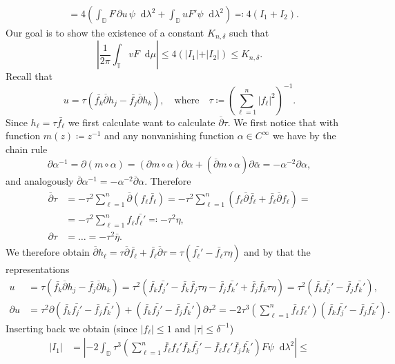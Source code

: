 \documentclass[letterpaper, 11pt]{article}
\newcommand{\D}{\mathbb{D}}
\newcommand{\T}{\mathbb{T}}
\newcommand{\1}{\mathds{1}}
\newcommand{\dd}{\mathop{}\!\mathrm{d}}
\newcommand{\wirtz}{\partial}
\newcommand{\wirtzbar}{\overline{\partial}}
\theoremstyle{definition}
\newenvironment{innerproof}
 {\renewcommand{\qedsymbol}{}\proof}
 {\endproof}
\begin{document}
\begin{innerproof}[Proof (continued)]
\begin{align*}
    &= 4 \left( \int_\D F \, \wirtz u \, \psi \dd \lambda^2 + \int_\D u F' \psi \dd \lambda^2 \right) \eqqcolon 4 (I_1 + I_2).
  \end{align*}
  Our goal is to show the existence of a constant $K_{n,\delta}$ such that
  $$ \left\vert \frac{1}{2 \pi} \int_\T v F \dd \mu \right\vert \leq 4 (\vert I_1 \vert + \vert I_2 \vert) \leq K_{n,\delta}. $$
  Recall that
  $$ u = \tau ( \bar{f_k} \wirtzbar h_j - \bar{f_j} \wirtzbar h_k), \quad \textrm{where} \quad \tau \coloneqq \left( \sum_{\ell=1}^n \vert f_\ell \vert^2 \right)^{-1}. $$
  Since $h_\ell = \tau \bar{f_\ell}$ we first calculate want to calculate $\wirtzbar \tau$. We first notice that with function $m(z) \coloneqq z^{-1}$ and any nonvanishing function $\alpha \in C^\infty$ we have by the chain rule
  $$ \wirtz \alpha^{-1} = \wirtz (m \circ \alpha) = (\wirtz m \circ \alpha) \wirtz \alpha + (\wirtzbar m \circ \alpha) \wirtz \bar{\alpha} = -\alpha^{-2} \partial \alpha, $$
  and analogously $\wirtzbar \alpha^{-1} = -\alpha^{-2} \wirtzbar \alpha$. Therefore
  \begin{align*}
    \wirtzbar \tau &= - \tau^2 \sum_{\ell=1}^n \wirtzbar (f_\ell \bar{f_\ell}) = -\tau^2 \sum_{\ell=1}^n ( f_\ell \wirtzbar \bar{f_\ell} + \bar{f_\ell} \wirtzbar f_\ell ) = \\
    &= -\tau^2 \sum_{\ell=1}^n f_\ell \bar{f_\ell'} \eqqcolon -\tau^2 \eta, \\
    \wirtz \tau &= \dots = -\tau^2 \bar{\eta}.
  \end{align*}
  We therefore obtain $ \wirtzbar h_\ell = \tau \wirtzbar \bar{f_\ell} + \bar{f_\ell} \wirtzbar \tau = \tau ( \bar{f_\ell'} - \bar{f_\ell} \tau \eta ) $ and by that the representations
  \begin{align*}
    u &= \tau ( \bar{f_k} \wirtzbar h_j - \bar{f_j} \wirtzbar h_k) = \tau^2 ( \bar{f_k} \bar{f_j'} - \bar{f_k} \bar{f_j} \tau \eta - \bar{f_j} \bar{f_k'} + \bar{f_j} \bar{f_k} \tau \eta ) = \tau^2 ( \bar{f_k} \bar{f_j'} - \bar{f_j} \bar{f_k'} ), \\
    \partial u &= \tau^2 \partial ( \bar{f_k} \bar{f_j'} - \bar{f_j} \bar{f_k'} ) + ( \bar{f_k} \bar{f_j'} - \bar{f_j} \bar{f_k'} ) \partial \tau^2 = -2 \tau^3 \left( \sum_{\ell=1}^n \bar{f_\ell} f_\ell' \right) ( \bar{f_k} \bar{f_j'} - \bar{f_j} \bar{f_k'} ).
  \end{align*}
  Inserting back we obtain (since $\vert f_\ell \vert \leq 1$ and $\vert \tau \vert \leq \delta^{-1}$)
  \begin{align*}
    \vert I_1 \vert &= \left\vert -2 \int_\D \tau^3 \left( \sum_{\ell=1}^n \bar{f_\ell} f_\ell' \bar{f_k} \bar{f_j'} - \bar{f_\ell} f_\ell' \bar{f_j} \bar{f_k'} \right) F \psi \dd \lambda^2 \right\vert \leq \\

\end{align*}
\end{innerproof}
\end{document}
